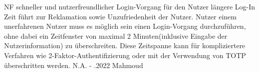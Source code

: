 \begin{myreq}
    \threeinline
    {\reqno}
    {\reqtype NF}
    {}
    \reqdesc schneller und nutzerfreundlicher Login-Vorgang für den Nutzer
    \reqrat längere Log-In Zeit führt zur Reklamation sowie Unzufriedenheit der Nutzer.
    \reqorig Nutzer
    \reqfit einem unerfahrenen Nutzer muss es möglich sein einen Login-Vorgang durchzuführen, ohne dabei ein Zeitfenster von maximal 2 Minuten(inklusive Eingabe der Nutzerinformation) zu überschreiten.
    Diese Zeitspanne kann für kompliziertere Verfahren wie 2-Faktor-Authentifizierung oder mit der Verwendung von TOTP überschritten werden.
    \twoinline
    {}
    {}
    \twoinline
    {}
    {\reqconf N.A.}
    \reqmater -
    .2022 Mahmoud
\end{myreq}